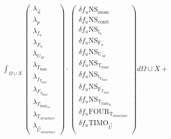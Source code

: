 \documentclass[10pt]{article} %
\begin{document}
\begin{center}
	$\int_{\Omega \cup X}
	\begin{pmatrix}
		\lambda_{\vec{u}} \\ \lambda_p \\ \lambda_{f_u} \\ \lambda_{F_u} \\ \lambda_{U_M}\\ \lambda_{T_{\text{fluid}}} \\ \lambda_{f_{T_{\text{fluid}}}} \\ \lambda_{F_{T_{\text{fluid}}}} \\ \lambda_{T_{\text{fluid}_M}} \\ \lambda_{T_{structure}} \\ \lambda_{\vec{U}_{structure}}
	\end{pmatrix}
	\cdot
	\begin{pmatrix}
		\delta f_u \text{NS}_{\text{mom}} \\
		\delta f_u \text{NS}_{\text{conti}}\\
		\delta f_u \text{NS}_{\text{f}_u} \\
		\delta f_u \text{NS}_{\text{F}_u} \\
		\delta f_u \text{NS}_{\text{U}_M} \\
		\delta f_u \text{NS}_{\text{T}_{\text{fluid}}} \\
		\delta f_u \text{NS}_{\text{f}_{\text{T}_{\text{fluid}}}}\\
		\delta f_u \text{NS}_{\text{F}_{\text{T}_{\text{fluid}}}}\\
		\delta f_u \text{NS}_{\text{T}_{\text{fluid}_M}}\\
		\delta f_u \text{FOUR}_{\text{T}_{\text{structure}}}\\
		\delta f_u \text{TIMO}_{\vec{U}}\\
	\end{pmatrix}
	d\Omega \cup X + $\\


\end{center}
\end{document}
